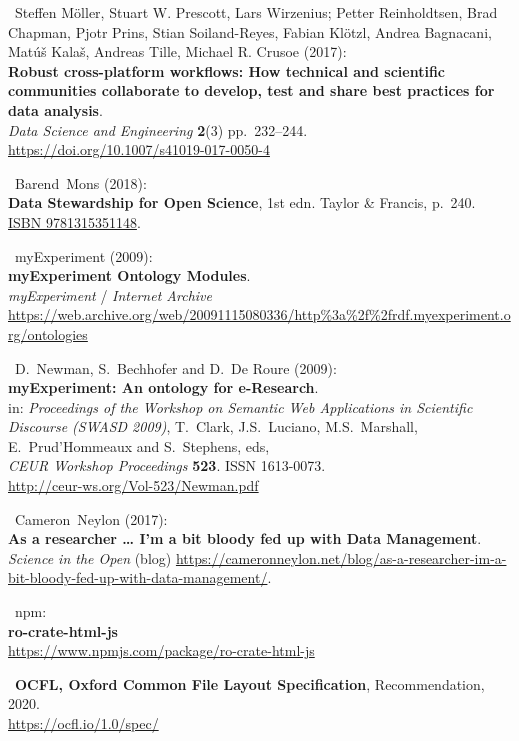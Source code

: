 \begin{thebibliography}{9}
~Steffen Möller, Stuart W. Prescott, Lars Wirzenius; Petter
Reinholdtsen, Brad Chapman, Pjotr Prins, Stian Soiland-Reyes, Fabian
Klötzl, Andrea Bagnacani, Matúš Kalaš, Andreas Tille, Michael R. Crusoe
(2017):\\
\textbf{Robust cross-platform workflows: How technical and scientific
communities collaborate to develop, test and share best practices for
data analysis}.\\
\emph{Data Science and Engineering} \textbf{2}(3) pp.~232--244.\\
\url{https://doi.org/10.1007/s41019-017-0050-4}

~Barend~Mons (2018):\\
\textbf{Data Stewardship for Open Science}, 1st edn. Taylor \& Francis,
p.~240. \href{https://identifiers.org/isbn/9781315351148}{ISBN
9781315351148}.

~myExperiment (2009):\\
\textbf{myExperiment Ontology Modules}.\\
\emph{myExperiment} / \emph{Internet Archive}\\
\url{https://web.archive.org/web/20091115080336/http\%3a\%2f\%2frdf.myexperiment.org/ontologies}

~D.~Newman, S.~Bechhofer and D.~De Roure (2009):\\
\textbf{myExperiment: An ontology for e-Research}.\\
in: \emph{Proceedings of the Workshop on Semantic Web Applications in
Scientific Discourse (SWASD 2009)}, T.~Clark, J.S.~Luciano,
M.S.~Marshall, E.~Prud'Hommeaux and S.~Stephens, eds,\\
\emph{CEUR Workshop Proceedings} \textbf{523}. ISSN 1613-0073.\\
\url{http://ceur-ws.org/Vol-523/Newman.pdf}

~Cameron~Neylon (2017):\\
\textbf{As a researcher \ldots{} I'm a bit bloody fed up with Data
Management}.\\
\emph{Science in the Open} (blog)
\url{https://cameronneylon.net/blog/as-a-researcher-im-a-bit-bloody-fed-up-with-data-management/}.

~npm:\\
\textbf{ro-crate-html-js}\\
\url{https://www.npmjs.com/package/ro-crate-html-js}

~\textbf{OCFL, Oxford Common File Layout Specification},
Recommendation, 2020.\\
\url{https://ocfl.io/1.0/spec/}


\end{thebibliography}
